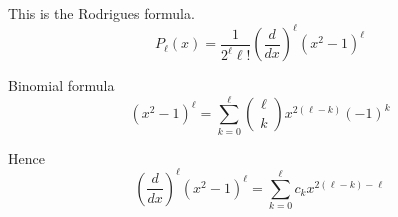 


This is the Rodrigues formula.
\begin{equation*}
P_\ell(x)=\frac{1}{2^\ell\ell!}\left(\frac{d}{dx}\right)^\ell
\left(x^2-1\right)^\ell
\end{equation*}

Binomial formula
\begin{equation*}
\left(x^2-1\right)^\ell=\sum_{k=0}^\ell\binom{\ell}{k}x^{2(\ell-k)}(-1)^k
\end{equation*}

Hence
\begin{equation*}
\left(\frac{d}{dx}\right)^\ell\left(x^2-1\right)^\ell
=\sum_{k=0}^\ell c_kx^{2(\ell-k)-\ell}
\end{equation*}


